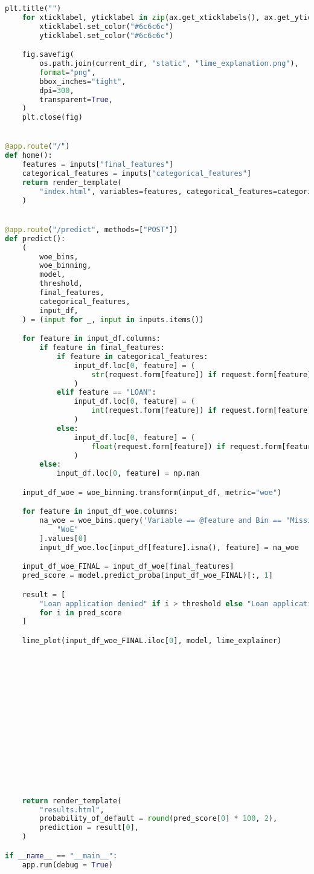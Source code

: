 \begin{lstlisting}[language=Python, basicstyle=\footnotesize\ttfamily]
	plt.title("")
	for xticklabel, yticklabel in zip(ax.get_xticklabels(), ax.get_yticklabels()):
		xticklabel.set_color("#6c6c6c")
		yticklabel.set_color("#6c6c6c")

	fig.savefig(
		os.path.join(current_dir, "static", "lime_explanation.png"),
		format="png",
		bbox_inches="tight",
		dpi=300,
		transparent=True,
	)
	plt.close(fig)


@app.route("/")
def home():
	features = inputs["final_features"]
	categorical_features = inputs["categorical_features"]
	return render_template(
		"index.html", variables=features, categorical_features=categorical_features
	)


@app.route("/predict", methods=["POST"])
def predict():
	(
		woe_bins,
		woe_binning,
		model,
		threshold,
		final_features,
		categorical_features,
		input_df,
	) = (input for _, input in inputs.items())

	for feature in input_df.columns:
		if feature in final_features:
			if feature in categorical_features:
				input_df.loc[0, feature] = (
					str(request.form[feature]) if request.form[feature] else np.nan
				)
			elif feature == "LOAN":
				input_df.loc[0, feature] = (
					int(request.form[feature]) if request.form[feature] else np.nan
				)
			else:
				input_df.loc[0, feature] = (
					float(request.form[feature]) if request.form[feature] else np.nan
				)
		else:
			input_df.loc[0, feature] = np.nan

	input_df_woe = woe_binning.transform(input_df, metric="woe")

	for feature in input_df_woe.columns:
		na_woe = woe_bins.query('Variable == @feature and Bin == "Missing"')[
			"WoE"
		].values[0]
		input_df_woe.loc[input_df[feature].isna(), feature] = na_woe

	input_df_woe_FINAL = input_df_woe[final_features]
	pred_score = model.predict_proba(input_df_woe_FINAL)[:, 1]

	result = [
		"Loan application denied" if i > threshold else "Loan application approved"
		for i in pred_score
	]

	lime_plot(input_df_woe_FINAL.iloc[0], model, lime_explainer)















	return render_template(
		"results.html",
		probability_of_default = round(pred_score[0] * 100, 2),
		prediction = result[0],
	)

if __name__ == "__main__":
	app.run(debug = True)	
\end{lstlisting}


